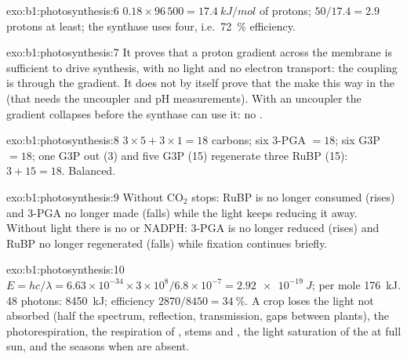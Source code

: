 \begin{solution}{exo:b1:photosynthesis:6}
$0.18\times 96\,500 = \qty{17.4}{kJ/mol}$ of protons; $50/17.4 = 2.9$
protons at least; the synthase uses four, i.e.\ \qty{72}{\%}
efficiency.
\end{solution}

\begin{solution}{exo:b1:photosynthesis:7}
It proves that a proton gradient across the  membrane is
sufficient to drive  synthesis, with no light and no electron
transport: the coupling is through the gradient. It does not by itself
prove that the  make  this way in the  (that
needs the uncoupler and pH measurements). With an uncoupler the
gradient collapses before the synthase can use it: no .
\end{solution}

\begin{solution}{exo:b1:photosynthesis:8}
$3\times 5 + 3\times 1 = 18$ carbons; six 3-PGA $= 18$; six G3P $= 18$;
one G3P out (3) and five G3P (15) regenerate three RuBP (15): $3 +
15 = 18$. Balanced.
\end{solution}

\begin{solution}{exo:b1:photosynthesis:9}
Without $\mathrm{CO_2}$  stops: RuBP is no longer consumed
(rises) and 3-PGA no longer made (falls) while the light keeps
reducing it away. Without light there is no  or NADPH: 3-PGA is no
longer reduced (rises) and RuBP no longer regenerated (falls) while
fixation continues briefly.
\end{solution}

\begin{solution}{exo:b1:photosynthesis:10}
$E = hc/\lambda = 6.63\times 10^{-34}\times 3\times 10^8/6.8\times
10^{-7} = \qty{2.92e-19}{J}$; per mole \qty{176}{kJ}. 48 photons:
\qty{8450}{kJ}; efficiency $2870/8450 = \qty{34}{\%}$. A crop loses the
light not absorbed (half the spectrum, reflection, transmission, gaps
between plants), the photorespiration, the respiration of , stems
and , the light saturation of the  at full sun, and the
seasons when  are absent.
\end{solution}

